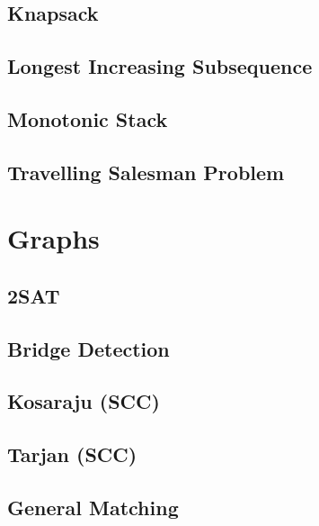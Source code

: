 \subsection{Knapsack}
\raggedbottom
\hrulefill
\subsection{Longest Increasing Subsequence}
\raggedbottom
\hrulefill
\subsection{Monotonic Stack}
\raggedbottom
\hrulefill
\subsection{Travelling Salesman Problem}
\raggedbottom
\hrulefill
\newpage

\section{Graphs}
\subsection{2SAT}
\raggedbottom
\hrulefill
\subsection{Bridge Detection}
\raggedbottom
\hrulefill
\subsection{Kosaraju (SCC)}
\raggedbottom
\hrulefill
\subsection{Tarjan (SCC)}
\raggedbottom
\hrulefill
\subsection{General Matching}
\raggedbottom
\hrulefill
